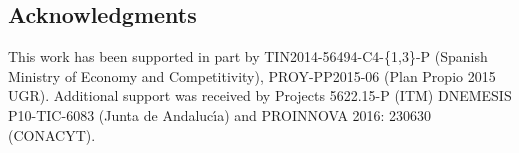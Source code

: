\documentclass{sig-alternate}
\begin{document}
\subsection*{Acknowledgments}
 
This work has been supported in part by
TIN2014-56494-C4-\{1,3\}-P (Spanish Ministry of Economy and
Competitivity), PROY-PP2015-06 (Plan Propio 2015 UGR). Additional
support was received by 
Projects 5622.15-P (ITM) DNEMESIS P10-TIC-6083 (Junta de
Andaluc\'{\i}a) and PROINNOVA 2016: 230630 (CONACYT). 



\end{document}
